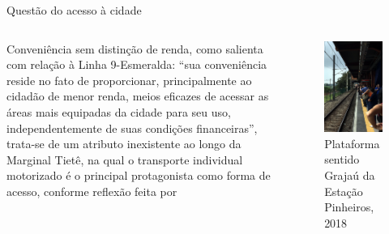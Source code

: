 \documentclass[spectratio=43, portuguese]{beamer}
\begin{document}
\begin{frame}{Questão do acesso à cidade}
	
	\begin{columns}
		
		Conveniência sem distinção de renda, como  salienta com relação à Linha 9-Esmeralda: ``sua conveniência reside no fato de proporcionar, principalmente ao cidadão de menor renda, meios eficazes de acessar as áreas mais equipadas da cidade para seu uso, independentemente de suas condições financeiras'', trata-se de um atributo inexistente ao longo da Marginal Tietê, na qual o transporte individual motorizado é o principal protagonista como forma de acesso, conforme reflexão feita por 
		
		\begin{figure}
			\centering
			\caption{Plataforma sentido Grajaú da Estação Pinheiros, 2018}
			\label{fig:plat_pin}
			\includegraphics[width=0.65\linewidth]{img/IMG_5838}
		\end{figure}
	\end{columns}
	
\end{frame}
\end{document}

